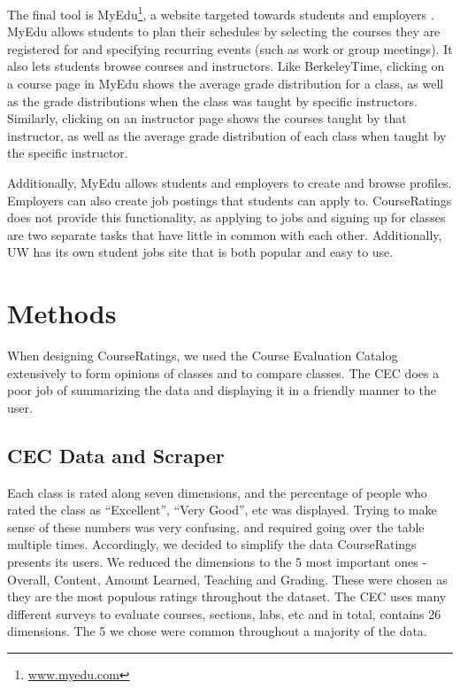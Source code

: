 \documentclass{chi2009}
\begin{document}
The final tool is MyEdu\footnote{\href{www.myedu.com}{www.myedu.com}}, a website targeted towards students and employers \cite{myedu}. MyEdu allows students to plan their schedules by selecting the courses they are registered for and specifying recurring events (such as work or group meetings). It also lets students browse courses and instructors. Like BerkeleyTime, clicking on a course page in MyEdu shows the average grade distribution for a class, as well as the grade distributions when the class was taught by specific instructors. Similarly, clicking on an instructor page shows the courses taught by that instructor, as well as the average grade distribution of each class when taught by the specific instructor.

Additionally, MyEdu allows students and employers to create and browse profiles. Employers can also create job postings that students can apply to. CourseRatings does not provide this functionality, as applying to jobs and signing up for classes are two separate tasks that have little in common with each other. Additionally, UW has its own student jobs site that is both popular and easy to use.

\section{Methods}

When designing CourseRatings, we used the Course Evaluation Catalog extensively to form opinions of classes and to compare classes. The CEC does a poor job of summarizing the data and displaying it in a friendly manner to the user.

\subsection{CEC Data and Scraper}
Each class is rated along seven dimensions, and the percentage of people who rated the class as ``Excellent'', ``Very Good'', etc was displayed. Trying to make sense of these numbers was very confusing, and required going over the table multiple times. Accordingly, we decided to simplify the data CourseRatings presents its users. We reduced the dimensions to the 5 most important ones - Overall, Content, Amount Learned, Teaching and Grading. These were chosen as they are the most populous ratings throughout the dataset. The CEC uses many different surveys to evaluate courses, sections, labs, etc and in total, contains 26 dimensions. The 5 we chose were common throughout a majority of the data.
\end{document}
